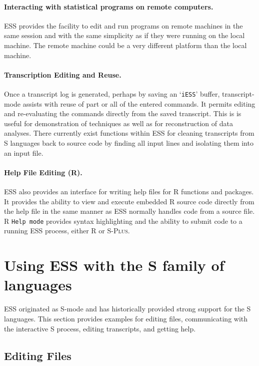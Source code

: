 \documentclass{article}
\newcommand*{\Splus}{\textsc{S-Plus}}
\newcommand{\stexttt}[1]{{\small\texttt{#1}}}
\newcommand{\file}[1]{`\stexttt{#1}'}
\begin{document}
\paragraph{Interacting with statistical programs on remote computers.}
ESS provides the facility to edit and run programs on remote machines
in the same session and with the same simplicity as if they were
running on the local machine.  The remote machine could be a very
different platform than the local machine.

\paragraph{Transcription Editing and Reuse.}
Once a transcript log is generated, perhaps by saving an \file{iESS}
buffer, transcript-mode assists with reuse of part or all of the
entered commands.  It permits editing and re-evaluating the commands
directly from the saved transcript.  This is is useful for
demonstration of techniques as well as for reconstruction of data
analyses.  There currently exist functions within ESS for cleaning
transcripts from S languages back to source code by finding all input
lines and isolating them into an input file.

\paragraph{Help File Editing (R).}
ESS also provides an interface for writing help files for R functions
and packages.  It provides the ability to view and execute embedded R
source code directly from the help file in the same manner as ESS
normally handles code from a source file.  R \stexttt{Help mode} provides syntax
highlighting and the ability to submit code to a running ESS
process, either R or \Splus.

\section{Using ESS with the S family of languages}
\label{sec:S}

ESS originated as S-mode and has historically provided strong support
for the S languages.  This section provides examples for
editing files, communicating with the interactive S process, editing
transcripts, and getting help.

\subsection{Editing Files}
\label{sec:S:edit}
\end{document}
